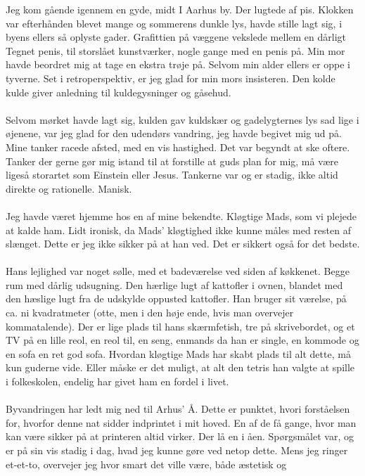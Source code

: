 \documentclass[]{article}
\begin{document}
Jeg kom gående igennem en gyde, midt I Aarhus by. Der lugtede af pis.
Klokken var efterhånden blevet mange og sommerens dunkle lys, havde stille
lagt sig, i byens ellers så oplyste gader. Grafittien på væggene vekslede mellem
en dårligt Tegnet penis, til storslået kunstværker, nogle gange med en penis på.
Min mor havde beordret mig at tage en ekstra trøje på. Selvom min alder ellers
er oppe i tyverne. Set i retroperspektiv, er jeg glad for min mors insisteren.
Den kolde kulde giver anledning til kuldegysninger og gåsehud.
\\
\\
Selvom mørket havde lagt sig, kulden gav kuldskær og gadelygternes lys sad
lige i øjenene, var jeg glad for den udendørs vandring, jeg havde begivet mig ud
på. Mine tanker racede afsted, med en vis hastighed. Det var begyndt at ske
oftere. Tanker der gerne gør mig istand til at forstille at guds plan for mig, må
være ligeså storartet som Einstein eller Jesus. Tankerne var og er stadig, ikke
altid direkte og rationelle. Manisk.
\\
\\
Jeg havde været hjemme hos en af mine bekendte. Kløgtige Mads, som vi
plejede at kalde ham. Lidt ironisk, da Mads’ kløgtighed ikke kunne måles med
resten af slænget. Dette er jeg ikke sikker på at han ved. Det er sikkert også
for det bedste.
\\
\\
Hans lejlighed var noget sølle, med et badeværelse ved siden af køkkenet. Begge
rum med dårlig udsugning. Den hærlige lugt af kattofler i ovnen, blandet med
den hæslige lugt fra de udskylde oppusted kattofler. Han bruger sit værelse, på
ca. ni kvadratmeter (otte, men i den høje ende, hvis man overvejer kommatalende). Der er lige plads til hans skærmfetish, tre på skrivebordet, og et TV på en lille reol, en reol til, en seng, enmands da han er single, en kommode og en sofa en ret god sofa. Hvordan kløgtige Mads har skabt plads til alt dette, må kun guderne vide. Eller måske er det muligt, at alt den tetris han valgte at spille i folkeskolen, endelig har givet ham en fordel i livet.
\\
\\
Byvandringen har ledt mig ned til Arhus’ Å. Dette er punktet, hvori forståelsen
for, hvorfor denne nat sidder indprintet i mit hoved. En af de få gange, hvor
man kan være sikker på at printeren altid virker. Der lå en i åen. Spørgsmålet
var, og er på sin vis stadig i dag, hvad jeg kunne gøre ved netop dette. Mens
jeg ringer et-et-to, overvejer jeg hvor smart det ville være, både æstetisk og
\end{document}
